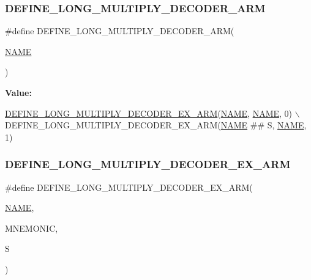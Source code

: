 \subsubsection{\texorpdfstring{D\+E\+F\+I\+N\+E\+\_\+\+L\+O\+N\+G\+\_\+\+M\+U\+L\+T\+I\+P\+L\+Y\+\_\+\+D\+E\+C\+O\+D\+E\+R\+\_\+\+A\+RM}{DEFINE\_LONG\_MULTIPLY\_DECODER\_ARM}}
{\footnotesize\ttfamily \#define D\+E\+F\+I\+N\+E\+\_\+\+L\+O\+N\+G\+\_\+\+M\+U\+L\+T\+I\+P\+L\+Y\+\_\+\+D\+E\+C\+O\+D\+E\+R\+\_\+\+A\+RM(\begin{DoxyParamCaption}\item[{}]{\mbox{\hyperlink{inflate_8h_a164ea0159d5f0b5f12a646f25f99eceaa67bc2ced260a8e43805d2480a785d312}{N\+A\+ME}} }\end{DoxyParamCaption})}

{\bfseries Value\+:}
\begin{DoxyCode}
\mbox{\hyperlink{decoder-arm_8c_af06f7d9feea3af0dff0fd68d50b8fb0c}{DEFINE\_LONG\_MULTIPLY\_DECODER\_EX\_ARM}}(\mbox{\hyperlink{inflate_8h_a164ea0159d5f0b5f12a646f25f99eceaa67bc2ced260a8e43805d2480a785d312}{NAME}}, 
      \mbox{\hyperlink{inflate_8h_a164ea0159d5f0b5f12a646f25f99eceaa67bc2ced260a8e43805d2480a785d312}{NAME}}, 0) \(\backslash\)
    DEFINE\_LONG\_MULTIPLY\_DECODER\_EX\_ARM(\mbox{\hyperlink{inflate_8h_a164ea0159d5f0b5f12a646f25f99eceaa67bc2ced260a8e43805d2480a785d312}{NAME}} ## S, \mbox{\hyperlink{inflate_8h_a164ea0159d5f0b5f12a646f25f99eceaa67bc2ced260a8e43805d2480a785d312}{NAME}}, 1)
\end{DoxyCode}
\mbox{\label{decoder-arm_8c_af06f7d9feea3af0dff0fd68d50b8fb0c}} 
\subsubsection{\texorpdfstring{D\+E\+F\+I\+N\+E\+\_\+\+L\+O\+N\+G\+\_\+\+M\+U\+L\+T\+I\+P\+L\+Y\+\_\+\+D\+E\+C\+O\+D\+E\+R\+\_\+\+E\+X\+\_\+\+A\+RM}{DEFINE\_LONG\_MULTIPLY\_DECODER\_EX\_ARM}}
{\footnotesize\ttfamily \#define D\+E\+F\+I\+N\+E\+\_\+\+L\+O\+N\+G\+\_\+\+M\+U\+L\+T\+I\+P\+L\+Y\+\_\+\+D\+E\+C\+O\+D\+E\+R\+\_\+\+E\+X\+\_\+\+A\+RM(\begin{DoxyParamCaption}\item[{}]{\mbox{\hyperlink{inflate_8h_a164ea0159d5f0b5f12a646f25f99eceaa67bc2ced260a8e43805d2480a785d312}{N\+A\+ME}},  }\item[{}]{M\+N\+E\+M\+O\+N\+IC,  }\item[{}]{S }\end{DoxyParamCaption})}

